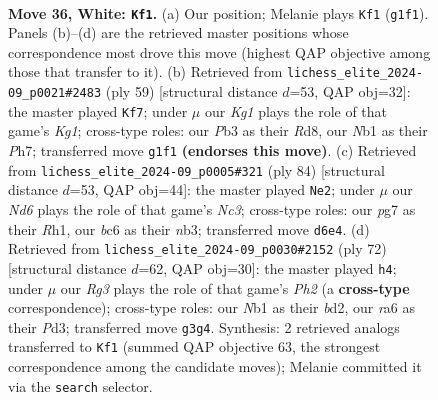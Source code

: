 \documentclass[11pt]{article}
\begin{document}
\clearpage

\begin{figure}[p]\centering
\begin{subfigure}{0.46\textwidth}\centering
\resizebox{\linewidth}{!}{%
\newchessgame
\chessboard[
  setfen={5k2/2r2ppp/rnbN4/p3p1P1/8/1P2P1R1/P5PP/RN4K1 w - - 0 36},
  showmover=false,
  pgfstyle=straightmove, color=movearrow, markmove={g1-f1}
]}
\caption{}
\end{subfigure}\hfill
\begin{subfigure}{0.46\textwidth}\centering
\resizebox{\linewidth}{!}{%
\newchessgame
\chessboard[
  setfen={3r2k1/1pr3pp/8/pP6/Pn1p1PP1/3P4/1B3R1P/3R2K1 b - - 0 30},
  showmover=false,
  pgfstyle=straightmove, color=movearrow, markmove={g8-f7}
]}
\caption{}
\end{subfigure}
\\[4pt]
\begin{subfigure}{0.46\textwidth}\centering
\resizebox{\linewidth}{!}{%
\newchessgame
\chessboard[
  setfen={1r3b2/r4pk1/2p5/3p4/p2P1PB1/1nN3P1/1PR2PK1/7R w - - 12 43},
  showmover=false,
  pgfstyle=straightmove, color=movearrow, markmove={c3-e2}
]}
\caption{}
\end{subfigure}\hfill
\begin{subfigure}{0.46\textwidth}\centering
\resizebox{\linewidth}{!}{%
\newchessgame
\chessboard[
  setfen={6k1/3r2pp/R2p1p2/1p1N1P2/3RP1P1/3P4/1r1b3P/7K w - - 0 37},
  showmover=false,
  pgfstyle=straightmove, color=movearrow, markmove={h2-h4}
]}
\caption{}
\end{subfigure}
\caption{\textbf{Move 36, White: \texttt{Kf1}.} (a) Our position; Melanie plays \texttt{Kf1} (\texttt{g1f1}). Panels (b)--(d) are the retrieved master positions whose correspondence most drove this move (highest QAP objective among those that transfer to it). (b) Retrieved from \texttt{lichess\_elite\_2024-09\_p0021\#2483} (ply 59) [structural distance $d$=53, QAP obj=32]: the master played \texttt{Kf7}; under $\mu$ our \emph{Kg1} plays the role of that game's \emph{Kg1}; cross-type roles: our \emph{P}b3 as their \emph{R}d8, our \emph{N}b1 as their \emph{P}h7; transferred move \texttt{g1f1} \textbf{(endorses this move)}. (c) Retrieved from \texttt{lichess\_elite\_2024-09\_p0005\#321} (ply 84) [structural distance $d$=53, QAP obj=44]: the master played \texttt{Ne2}; under $\mu$ our \emph{Nd6} plays the role of that game's \emph{Nc3}; cross-type roles: our \emph{p}g7 as their \emph{R}h1, our \emph{b}c6 as their \emph{n}b3; transferred move \texttt{d6e4}. (d) Retrieved from \texttt{lichess\_elite\_2024-09\_p0030\#2152} (ply 72) [structural distance $d$=62, QAP obj=30]: the master played \texttt{h4}; under $\mu$ our \emph{Rg3} plays the role of that game's \emph{Ph2} (a \textbf{cross-type} correspondence); cross-type roles: our \emph{N}b1 as their \emph{b}d2, our \emph{r}a6 as their \emph{P}d3; transferred move \texttt{g3g4}. Synthesis: 2 retrieved analogs transferred to \texttt{Kf1} (summed QAP objective 63, the strongest correspondence among the candidate moves); Melanie committed it via the \texttt{search} selector.}
\label{fig:thought-m70}
\end{figure}
\end{document}
